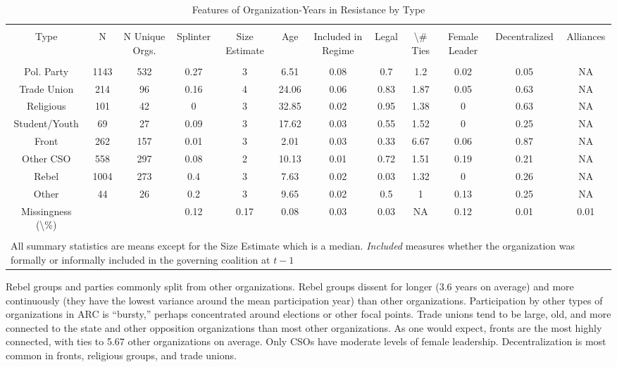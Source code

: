 \begin{landscape}

\begin{table}[!htbp] \centering 
  \caption{Features of Organization-Years in Resistance by Type} 
  \label{Tab: Types} 
\begin{tabular}{@{\extracolsep{5pt}} cccccccccccc} 
\\[-1.8ex]\hline 
\hline \\[-1.8ex] 
Type & N & N Unique Orgs. & Splinter & Size Estimate & Age & Included in Regime & Legal & \textbackslash \# Ties & Female Leader & Decentralized & Alliances \\ 
\hline \\[-1.8ex] 
Pol. Party & 1143 & 532 & 0.27 & 3 & 6.51 & 0.08 & 0.7 & 1.2 & 0.02 & 0.05 & NA \\ 
Trade Union & 214 & 96 & 0.16 & 4 & 24.06 & 0.06 & 0.83 & 1.87 & 0.05 & 0.63 & NA \\ 
Religious & 101 & 42 & 0 & 3 & 32.85 & 0.02 & 0.95 & 1.38 & 0 & 0.63 & NA \\ 
Student/Youth & 69 & 27 & 0.09 & 3 & 17.62 & 0.03 & 0.55 & 1.52 & 0 & 0.25 & NA \\ 
Front & 262 & 157 & 0.01 & 3 & 2.01 & 0.03 & 0.33 & 6.67 & 0.06 & 0.87 & NA \\ 
Other CSO & 558 & 297 & 0.08 & 2 & 10.13 & 0.01 & 0.72 & 1.51 & 0.19 & 0.21 & NA \\ 
Rebel & 1004 & 273 & 0.4 & 3 & 7.63 & 0.02 & 0.03 & 1.32 & 0 & 0.26 & NA \\ 
Other & 44 & 26 & 0.2 & 3 & 9.65 & 0.02 & 0.5 & 1 & 0.13 & 0.25 & NA \\ 
Missingness (\textbackslash \%) &  &  & 0.12 & 0.17 & 0.08 & 0.03 & 0.03 & NA & 0.12 & 0.01 & 0.01 \\ 
\hline \\[-1.8ex] 
\multicolumn{12}{l}{All summary statistics are means except for the Size Estimate which is a median. \textit{Included} measures whether the organization was formally or informally included in the governing coalition at $t-1$} \\ 
\end{tabular} 
\end{table} 


\end{landscape}


Rebel groups and parties commonly split from other organizations. Rebel groups dissent for longer (3.6 years on average) and more continuously (they have the lowest variance around the mean participation year) than other organizations. Participation by other types of organizations in ARC is ``bursty,'' perhaps concentrated around elections or other focal points. Trade unions tend to be large, old, and more connected to the state and other opposition organizations than most other organizations. As one would expect, fronts are the most highly connected, with ties to 5.67 other organizations on average. Only CSOs have moderate levels of female leadership. Decentralization is most common in fronts, religious groups, and trade unions.

